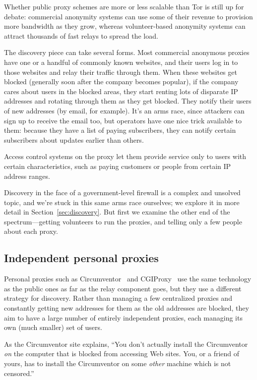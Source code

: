 \documentclass{llncs}
\begin{document}
Whether public proxy schemes are more or less scalable than Tor is
still up for debate: commercial anonymity systems can use some of their
revenue to provision more bandwidth as they grow, whereas volunteer-based
anonymity systems can attract thousands of fast relays to spread the load.

The discovery piece can take several forms. Most commercial anonymous
proxies have one or a handful of commonly known websites, and their users
log in to those websites and relay their traffic through them. When
these websites get blocked (generally soon after the company becomes
popular), if the company cares about users in the blocked areas, they
start renting lots of disparate IP addresses and rotating through them
as they get blocked. They notify their users of new addresses (by email,
for example). It's an arms race, since attackers can sign up to receive the
email too, but operators have one nice trick available to them: because they
have a list of paying subscribers, they can notify certain subscribers
about updates earlier than others.

Access control systems on the proxy let them provide service only to
users with certain characteristics, such as paying customers or people
from certain IP address ranges.

Discovery in the face of a government-level firewall is a complex and
unsolved
topic, and we're stuck in this same arms race ourselves; we explore it
in more detail in Section~\ref{sec:discovery}. But first we examine the
other end of the spectrum---getting volunteers to run the proxies,
and telling only a few people about each proxy.

\subsection{Independent personal proxies}

Personal proxies such as Circumventor~\cite{circumventor} and
CGIProxy~\cite{cgiproxy} use the same technology as the public ones as
far as the relay component goes, but they use a different strategy for
discovery. Rather than managing a few centralized proxies and constantly
getting new addresses for them as the old addresses are blocked, they
aim to have a large number of entirely independent proxies, each managing
its own (much smaller) set of users.

As the Circumventor site explains, ``You don't
actually install the Circumventor \emph{on} the computer that is blocked
from accessing Web sites. You, or a friend of yours, has to install the
Circumventor on some \emph{other} machine which is not censored.''
\end{document}
